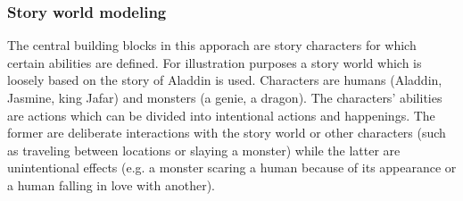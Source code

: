 \subsubsection{Story world modeling}
The central building blocks in this apporach are story characters for which certain abilities are defined. For illustration purposes a story world which is loosely based on the story of Aladdin is used. Characters are humans (Aladdin, Jasmine, king Jafar) and monsters (a genie, a dragon). The characters' abilities are actions which can be divided into intentional actions and happenings. The former are deliberate interactions with the story world or other characters (such as traveling between locations or slaying a monster) while the latter are unintentional effects (e.g. a monster scaring a human because of its appearance or a human falling in love with another).

